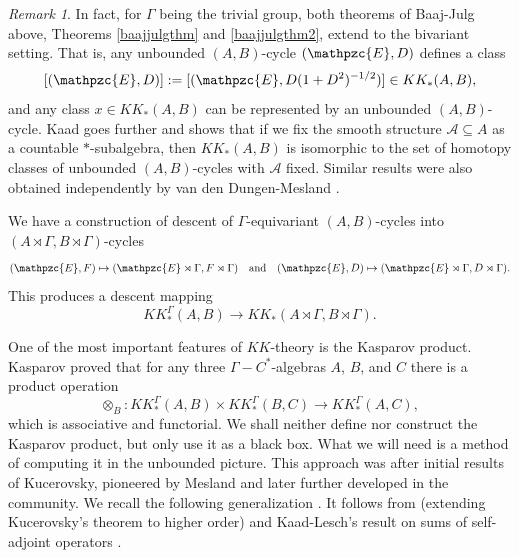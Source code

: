 \documentclass[a4paper,reqno]{amsart}
\numberwithin{equation}{section}
\theoremstyle{definition}
\theoremstyle{remark}
\newtheorem{remark}[thm]{Remark}
\begin{document}
\begin{remark}
In fact, for $\Gamma$ being the trivial group, both theorems of Baaj-Julg above, Theorems \ref{baajjulgthm} and \ref{baajjulgthm2}, extend to the bivariant setting. That is, any unbounded $(A,B)$-cycle $(\mathpzc{E},D)$ defines a class 
$$[(\mathpzc{E},D)]:=[(\mathpzc{E},D(1+D^2)^{-1/2})]\in KK_*(A,B),$$
and any class $x\in KK_*(A,B)$ can be represented by an unbounded $(A,B)$-cycle. Kaad \cite{kaadhomoun} goes further and shows that if we fix the smooth structure $\mathcal{A}\subseteq A$ as a countable $*$-subalgebra, then $KK_*(A,B)$ is isomorphic to the set of homotopy classes of unbounded $(A,B)$-cycles with $\mathcal{A}$ fixed. Similar results were also obtained independently by van den Dungen-Mesland \cite{meslsdlda}.
\end{remark}


We have a construction of descent of $\Gamma$-equivariant $(A,B)$-cycles into $(A\rtimes \Gamma,B\rtimes \Gamma)$-cycles
$$(\mathpzc{E},F)\mapsto (\mathpzc{E}\rtimes \Gamma,F\rtimes \Gamma)\quad\mbox{and}\quad(\mathpzc{E},D)\mapsto (\mathpzc{E}\rtimes \Gamma,D\rtimes \Gamma).$$
This produces a descent mapping 
$$KK_*^\Gamma(A,B)\to KK_*(A\rtimes \Gamma,B\rtimes \Gamma).$$


One of the most important features of $KK$-theory is the Kasparov product. Kasparov \cite{kaspinv} proved that for any three $\Gamma-C^*$-algebras $A$, $B$, and $C$ there is a product operation 
$$\otimes_B:KK_*^\Gamma(A,B)\times KK_*^\Gamma(B,C)\to KK_*^\Gamma(A,C),$$
which is associative and functorial. We shall neither define nor construct the Kasparov product, but only use it as a black box. What we will need is a method of computing it in the unbounded picture. This approach was after initial results of Kucerovsky, pioneered by Mesland \cite{thebeastofmesland} and later further developed \cite{leschkaadsf,leschmes} in the community. We recall the following generalization \cite[Theorem 6.3.4]{thebeastofmesland}. It follows from \cite[Theorem A.7]{GM15} (extending Kucerovsky's theorem \cite{dantheman} to higher order) and Kaad-Lesch's result on sums of self-adjoint operators \cite{leschkaadlocal,leschkaadsf}. 
\end{document}
